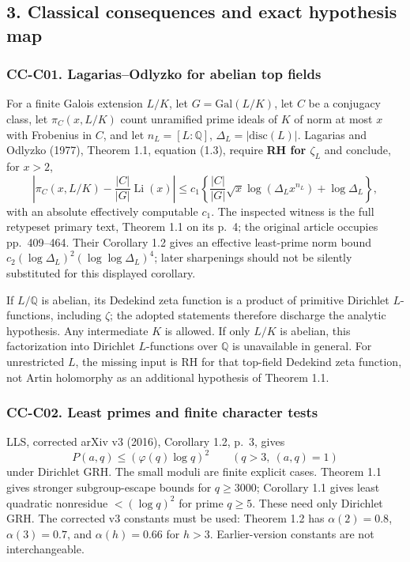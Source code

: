 \documentclass[11pt,a4paper]{article}
\theoremstyle{definition}\newtheorem{definition}[theorem]{Definition}
\theoremstyle{remark}\newtheorem{remark}[theorem]{Remark}
\begin{document}
\subsection{3. Classical consequences and exact hypothesis
map}\label{classical-consequences-and-exact-hypothesis-map}

\subsubsection{CC-C01. Lagarias--Odlyzko for abelian top
fields}\label{cc-c01.-lagariasodlyzko-for-abelian-top-fields}

For a finite Galois extension \(L/K\), let \(G=\mathrm{Gal}(L/K)\), let
\(C\) be a conjugacy class, let \(\pi_C(x,L/K)\) count unramified prime
ideals of \(K\) of norm at most \(x\) with Frobenius in \(C\), and let
\(n_L=[L:\mathbb Q]\), \(\Delta_L=|\mathrm{disc}(L)|\). Lagarias and
Odlyzko (1977), Theorem 1.1, equation (1.3), require \textbf{RH for
\(\zeta_L\)} and conclude, for \(x>2\), \[
 \left|\pi_C(x,L/K)-\frac{|C|}{|G|}\operatorname{Li}(x)\right|
 \le c_1\left\{\frac{|C|}{|G|}\sqrt{x}\log(\Delta_Lx^{n_L})+\log\Delta_L\right\},
\] with an absolute effectively computable \(c_1\). The inspected
witness is the full retypeset primary text, Theorem 1.1 on its p.~4; the
original article occupies pp.~409--464. Their Corollary 1.2 gives an
effective least-prime norm bound
\(c_2(\log\Delta_L)^2(\log\log\Delta_L)^4\); later sharpenings should
not be silently substituted for this displayed corollary.

If \(L/\mathbb Q\) is abelian, its Dedekind zeta function is a product
of primitive Dirichlet \(L\)-functions, including \(\zeta\); the adopted
statements therefore discharge the analytic hypothesis. Any intermediate
\(K\) is allowed. If only \(L/K\) is abelian, this factorization into
Dirichlet \(L\)-functions over \(\mathbb Q\) is unavailable in general.
For unrestricted \(L\), the missing input is RH for that top-field
Dedekind zeta function, not Artin holomorphy as an additional hypothesis
of Theorem 1.1.

\subsubsection{CC-C02. Least primes and finite character
tests}\label{cc-c02.-least-primes-and-finite-character-tests}

LLS, corrected arXiv v3 (2016), Corollary 1.2, p.~3, gives \[
 P(a,q)\le (\varphi(q)\log q)^2\qquad(q>3,\ (a,q)=1)
\] under Dirichlet GRH. The small moduli are finite explicit cases.
Theorem 1.1 gives stronger subgroup-escape bounds for \(q\ge3000\);
Corollary 1.1 gives least quadratic nonresidue \(<(\log q)^2\) for prime
\(q\ge5\). These need only Dirichlet GRH. The corrected v3 constants
must be used: Theorem 1.2 has \(\alpha(2)=0.8\), \(\alpha(3)=0.7\), and
\(\alpha(h)=0.66\) for \(h>3\). Earlier-version constants are not
interchangeable.
\end{document}
